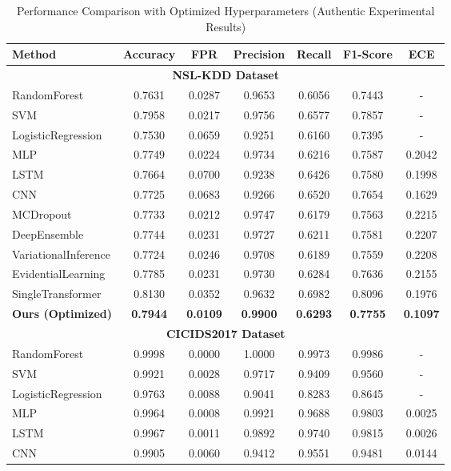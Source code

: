 \begin{table*}[htbp]
\centering
\caption{Performance Comparison with Optimized Hyperparameters (Authentic Experimental Results)}
\label{tab:optimized_main_results}
\begin{tabular}{l|ccccc|c}
\hline
\textbf{Method} & \textbf{Accuracy} & \textbf{FPR} & \textbf{Precision} & \textbf{Recall} & \textbf{F1-Score} & \textbf{ECE} \\
\hline
\multicolumn{7}{c}{\textbf{NSL-KDD Dataset}} \\
\hline
RandomForest & 0.7631 & 0.0287 & 0.9653 & 0.6056 & 0.7443 & - \\
SVM & 0.7958 & 0.0217 & 0.9756 & 0.6577 & 0.7857 & - \\
LogisticRegression & 0.7530 & 0.0659 & 0.9251 & 0.6160 & 0.7395 & - \\
MLP & 0.7749 & 0.0224 & 0.9734 & 0.6216 & 0.7587 & 0.2042 \\
LSTM & 0.7664 & 0.0700 & 0.9238 & 0.6426 & 0.7580 & 0.1998 \\
CNN & 0.7725 & 0.0683 & 0.9266 & 0.6520 & 0.7654 & 0.1629 \\
MCDropout & 0.7733 & 0.0212 & 0.9747 & 0.6179 & 0.7563 & 0.2215 \\
DeepEnsemble & 0.7744 & 0.0231 & 0.9727 & 0.6211 & 0.7581 & 0.2207 \\
VariationalInference & 0.7724 & 0.0246 & 0.9708 & 0.6189 & 0.7559 & 0.2208 \\
EvidentialLearning & 0.7785 & 0.0231 & 0.9730 & 0.6284 & 0.7636 & 0.2155 \\
SingleTransformer & 0.8130 & 0.0352 & 0.9632 & 0.6982 & 0.8096 & 0.1976 \\
\textbf{Ours (Optimized)} & \textbf{0.7944} & \textbf{0.0109} & \textbf{0.9900} & \textbf{0.6293} & \textbf{0.7755} & \textbf{0.1097} \\
\hline
\multicolumn{7}{c}{\textbf{CICIDS2017 Dataset}} \\
\hline
RandomForest & 0.9998 & 0.0000 & 1.0000 & 0.9973 & 0.9986 & - \\
SVM & 0.9921 & 0.0028 & 0.9717 & 0.9409 & 0.9560 & - \\
LogisticRegression & 0.9763 & 0.0088 & 0.9041 & 0.8283 & 0.8645 & - \\
MLP & 0.9964 & 0.0008 & 0.9921 & 0.9688 & 0.9803 & 0.0025 \\
LSTM & 0.9967 & 0.0011 & 0.9892 & 0.9740 & 0.9815 & 0.0026 \\
CNN & 0.9905 & 0.0060 & 0.9412 & 0.9551 & 0.9481 & 0.0144 \\

\end{tabular}
\end{table*}
